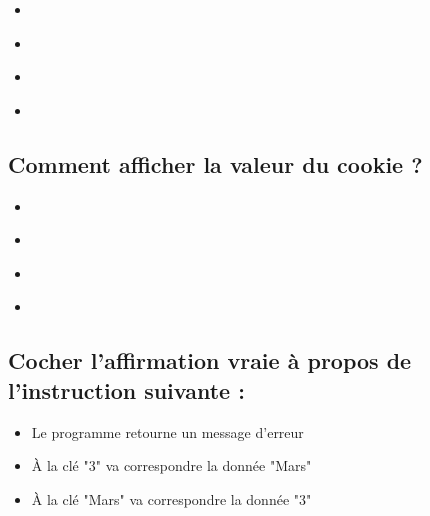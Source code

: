 \documentclass[11pt,a4paper]{article}
\begin{document}
\begin{itemize}
\item[\CaseCoche] \TTBF{==} \\
\item[\CaseCoche]  \\  %
\item[\CaseCoche]  \\
\item[\CaseCoche]  \\  %
\end{itemize}


\subsection{Comment afficher la valeur du cookie  ?}

\begin{itemize}
\item[\CaseCoche]  \\
\item[\CaseCoche]  \\
\item[\CaseCoche]  \\
\item[\CaseCoche]  \\  %

\end{itemize}


\subsection{Cocher l'affirmation vraie à propos de l'instruction suivante :}


\bigskip

\begin{itemize}
\item[\CaseCoche] Le programme retourne un message d'erreur \\
\item[\CaseCoche] \`A la clé "3" va correspondre la donnée "Mars" \\   %
\item[\CaseCoche] \`A la clé "Mars" va correspondre la donnée "3" \\
\end{itemize}
\end{document}
